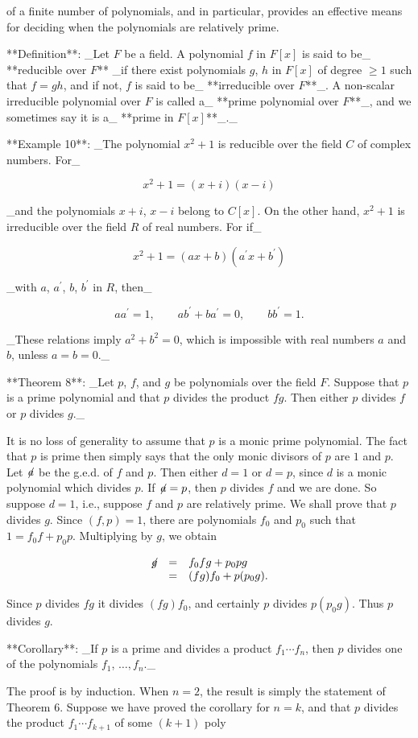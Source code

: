 of a finite number of polynomials, and in particular, provides an effective means for deciding when the polynomials are relatively prime.

**Definition**: _Let \(F\) be a field. A polynomial \(f\) in \(F[x]\) is said to be_ **reducible over \(F\)** _if there exist polynomials \(g\), \(h\) in \(F[x]\) of degree \(\geq 1\) such that \(f=gh\), and if not, \(f\) is said to be_ **irreducible over \(F\)**_. A non-scalar irreducible polynomial over \(F\) is called a_ **prime polynomial over \(F\)**_, and we sometimes say it is a_ **prime in \(F[x]\)**_._

**Example 10**: _The polynomial \(x^{2}+1\) is reducible over the field \(C\) of complex numbers. For_

\[x^{2}+1=(x+i)(x-i)\]

_and the polynomials \(x+i\), \(x-i\) belong to \(C[x]\). On the other hand, \(x^{2}+1\) is irreducible over the field \(R\) of real numbers. For if_

\[x^{2}+1=(ax+b)(a^{\prime}x+b^{\prime})\]

_with \(a\), \(a^{\prime}\), \(b\), \(b^{\prime}\) in \(R\), then_

\[aa^{\prime}=1,\qquad ab^{\prime}+ba^{\prime}=0,\qquad bb^{\prime}=1.\]

_These relations imply \(a^{2}+b^{2}=0\), which is impossible with real numbers \(a\) and \(b\), unless \(a=b=0\)._

**Theorem 8**: _Let \(p\), \(f\), and \(g\) be polynomials over the field \(F\). Suppose that \(p\) is a prime polynomial and that \(p\) divides the product \(fg\). Then either \(p\) divides \(f\) or \(p\) divides \(g\)._

It is no loss of generality to assume that \(p\) is a monic prime polynomial. The fact that \(p\) is prime then simply says that the only monic divisors of \(p\) are \(1\) and \(p\). Let \(\not\!a\) be the g.e.d. of \(f\) and \(p\). Then either \(d=1\) or \(d=p\), since \(d\) is a monic polynomial which divides \(p\). If \(\not\!a=p\), then \(p\) divides \(f\) and we are done. So suppose \(d=1\), i.e., suppose \(f\) and \(p\) are relatively prime. We shall prove that \(p\) divides \(g\). Since \((f,p)=1\), there are polynomials \(f_{0}\) and \(p_{0}\) such that \(1=f_{0}f+p_{0}p\). Multiplying by \(g\), we obtain

\[\begin{array}{lcl}\not\!g&=&f_{0}fg+p_{0}pg\\ &=&(fg)f_{0}+p(p_{0}g).\end{array}\]

Since \(p\) divides \(fg\) it divides \((fg)f_{0}\), and certainly \(p\) divides \(p(p_{0}g)\). Thus \(p\) divides \(g\).

**Corollary**: _If \(p\) is a prime and divides a product \(f_{1}\cdots f_{n}\), then \(p\) divides one of the polynomials \(f_{1}\), \(\ldots,f_{n}\)._

The proof is by induction. When \(n=2\), the result is simply the statement of Theorem 6. Suppose we have proved the corollary for \(n=k\), and that \(p\) divides the product \(f_{1}\cdots f_{k+1}\) of some \((k+1)\) poly 